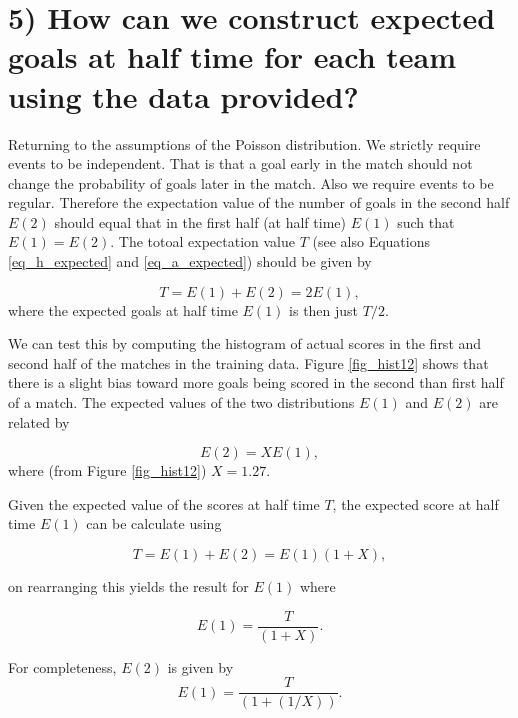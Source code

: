\documentclass[10pt]{article}
\begin{document}
\section{5) How can we construct expected goals at half time for each team using the data provided?}

Returning to the assumptions of the Poisson distribution. We strictly require events to be independent. That is that a goal early in the match should not change the probability of goals later in the match. Also we require events to be regular. Therefore the expectation value of the number of goals in the second half $E(2)$ should equal that in the first half (at half time) $E(1)$ such that $E(1) = E(2)$. The totoal expectation value $T$ (see also Equations \ref{eq_h_expected} and \ref{eq_a_expected}) should be given by

\begin{equation}
\label{eq_e12_should}
T = E(1) + E(2) = 2E(1),
\end{equation}
\noindent where the expected goals at half time $E(1)$ is then just $T/2$.

We can test this by computing the histogram of actual scores in the first and second half of the matches in the training data. Figure \ref{fig_hist12} shows that there is a slight bias toward more goals being scored in the second than first half of a match. The expected values of the two distributions $E(1)$ and $E(2)$ are related by 

\begin{equation}
\label{eq_x12}
E(2) = XE(1),
\end{equation}
\noindent where (from Figure \ref{fig_hist12}) $X = 1.27$.

Given the expected value of the scores at half time $T$, the expected score at half time $E(1)$ can be calculate using 

\begin{equation}
\label{eq_ex_half_x_halfway}
T = E(1) + E(2) = E(1) \left(1 + X \right),
\end{equation}

\noindent on rearranging this yields the result for $E(1)$ where

\begin{equation}
\label{eq_ex_half_x}
E(1) =\frac{T}{ \left(1 + X \right)}.
\end{equation}

\noindent For completeness, $E(2)$ is given by
\begin{equation}
\label{eq_ex_half_x_e2}
E(1) =\frac{T}{ \left(1 + \left( 1/X\right) \right)}.
\end{equation}
\end{document}
